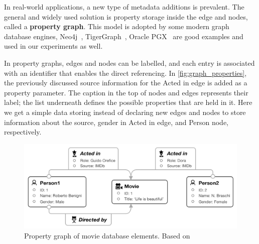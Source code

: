 In real-world applications, a new type of metadata additions is prevalent.
The general and widely used solution is property storage inside the edge and nodes, called a \textbf{property graph}.
This model is adopted by some modern graph database engines, Neo4j~\cite{neo4j_website}, TigerGraph~\cite{tigergraph_website}, Oracle PGX~\cite{pgx_website} are good examples and used in our experiments as well.

In property graphs, edges and nodes can be labelled, and each entry is associated with an identifier that enables the direct referencing.
In \autoref{fig:graph_properties}, the previously discussed source information for the \textsf{Acted in} edge is added as a property parameter.
The caption in the top of nodes and edges represents their label; the list underneath defines the possible properties that are held in it.
Here we get a simple data storing instead of declaring new edges and nodes to store information about the source, gender in \textsf{Acted in} edge, and \textsf{Person} node, respectively.

\begin{figure}[!ht]
  \centering
  \includegraphics[scale=0.26]{figures/graph_properties.png}
  \caption{Property graph of movie database elements. Based on~\cite{DBLP:journals/csur/AnglesABHRV17}} 
  \label{fig:graph_properties}
\end{figure}

